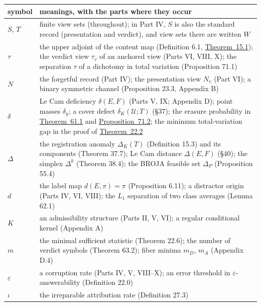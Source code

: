{\def\LTcaptype{none} %
\begin{longtable}[]{@{}
  >{\raggedright\arraybackslash}p{}
  >{\raggedright\arraybackslash}p{}@{}}
\toprule\noalign{}
\begin{minipage}[b]{\linewidth}\raggedright
symbol
\end{minipage} & \begin{minipage}[b]{\linewidth}\raggedright
meanings, with the parts where they occur
\end{minipage} \\
\midrule\noalign{}
\endhead
\bottomrule\noalign{}
\endlastfoot
\(S\), \(T\) & finite view sets (throughout); in Part IV, \(S\) is also the standard record (presentation and verdict), and view sets there are written \(W\) \\
\(\tau\) & the upper adjoint of the content map (Definition 6.1, \hyperlink{stmt:15.1}{Theorem~15.1}); the verdict view \(\tau_v\) of an anchored view (Parts VI, VIII, X); the separation \(\tau\) of a dichotomy in total variation (Proposition 71.1) \\
\(N\) & the forgetful record (Part IV); the presentation view \(N_v\) (Part VI); a binary symmetric channel (Proposition 23.3, Appendix B) \\
\(\delta\) & Le Cam deficiency \(\delta(E,F)\) (Parts V, IX; Appendix D); point masses \(\delta_y\); a cover defect \(\delta_K(\mathcal U;T)\) (§37); the erasure probability in \hyperlink{stmt:61.1}{Theorem~61.1} and \hyperlink{stmt:71.2}{Proposition~71.2}; the minimum total-variation gap in the proof of \hyperlink{stmt:22.2}{Theorem~22.2} \\
\(\Delta\) & the registration anomaly \(\Delta_K(T)\) (Definition 15.3) and its components (Theorem 37.7); Le Cam distance \(\Delta(E,F)\) (§40); the simplex \(\Delta^k\) (Theorem 38.4); the BROJA feasible set \(\Delta_P\) (Proposition 55.4) \\
\(d\) & the label map \(d(E,\pi)=\pi\) (Proposition 6.11); a distractor origin (Parts IV, VI, VIII); the \(L_1\) separation of two class averages (Lemma 62.1) \\
\(K\) & an admissibility structure (Parts II, V, VI); a regular conditional kernel (Appendix A) \\
\(m\) & the minimal sufficient statistic (Theorem 22.6); the number of verdict symbols (Theorem 63.2); fiber minima \(m_D\), \(m_A\) (Appendix D.4) \\
\(\varepsilon\) & a corruption rate (Parts IV, V, VIII--X); an error threshold in \(\varepsilon\)-answerability (Definition 22.0) \\
\(\iota\) & the irreparable attribution rate (Definition 27.3) \\
\end{longtable}
}

